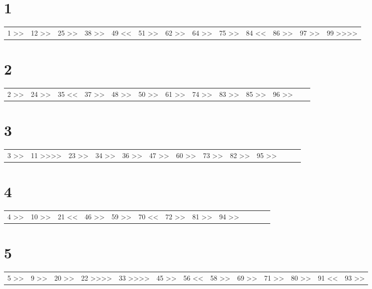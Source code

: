 \documentclass[11pt]{article}
\begin{document}
\section{1}
\label{sec-3}
\begin{center}
\begin{tabular}{lllllllllllll}
1 >> & 12 >> & 25 >> & 38 >> & 49 << & 51 >> & 62 >> & 64 >> & 75 >> & 84 << & 86 >> & 97 >> & 99 >>>>\\
\end{tabular}
\end{center}
\section{2}
\label{sec-4}
\begin{center}
\begin{tabular}{lllllllllllll}
2 >> & 24 >> & 35 << & 37 >> & 48 >> & 50 >> & 61 >> & 74 >> & 83 >> & 85 >> & 96 >> &  & \\
\end{tabular}
\end{center}
\section{3}
\label{sec-5}
\begin{center}
\begin{tabular}{lllllllllllll}
3 >> & 11 >>>> & 23 >> & 34 >> & 36 >> & 47 >> & 60 >> & 73 >> & 82 >> & 95 >> &  &  & \\
\end{tabular}
\end{center}
\section{4}
\label{sec-6}
\begin{center}
\begin{tabular}{lllllllllllll}
4 >> & 10 >> & 21 << & 46 >> & 59 >> & 70 << & 72 >> & 81 >> & 94 >> &  &  &  & \\
\end{tabular}
\end{center}
\section{5}
\label{sec-7}
\begin{center}
\begin{tabular}{lllllllllllll}
5 >> & 9 >> & 20 >> & 22 >>>> & 33 >>>> & 45 >> & 56 << & 58 >> & 69 >> & 71 >> & 80 >> & 91 << & 93 >>\\
\end{tabular}
\end{center}
\end{document}
